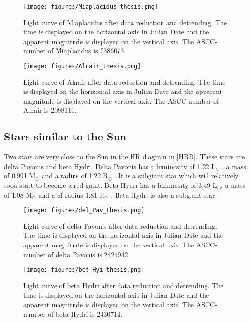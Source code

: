 \documentclass[onecolumn]{aa} %
\begin{document}
\begin{enumerate}
\begin{figure}
    \centering
    \texttt{[image: figures/Miaplacidus\_thesis.png]}
    \caption{Light curve of Miaplacidus after data reduction and detrending. The time is displayed on the horizontal axis in Julian Date and the apparent magnitude is displayed on the vertical axis. The ASCC-number of Miaplacidus is 2386073.}
    \label{Miaplacidus}
\end{figure}

\begin{figure}
    \centering
    \texttt{[image: figures/Alnair\_thesis.png]}
    \caption{Light curve of Alnair after data reduction and detrending. The time is displayed on the horizontal axis in Julian Date and the apparent magnitude is displayed on the vertical axis. The ASCC-number of Alnair is 2098110.}
    \label{Alnair}
\end{figure}
\end{enumerate}

\subsection{Stars similar to the Sun} 
Two stars are very close to the Sun in the HR diagram in \ref{HRD}. These stars are delta Pavonis and beta Hydri. Delta Pavonis has a luminosity of 1.22 L$_\odot$ \citep{Bruntt_2010}, a mass of 0.991 M$_\odot$ and a radius of 1.22 R$_\odot$ \citep{2008yCat..21680297T}. It is a subgiant star which will relatively soon start to become a red giant. Beta Hydri has a luminosity of 3.49 L$_\odot$, a mass of 1.08 M$_\odot$ and a of radius 1.81 R$_\odot$ \citep{Brand_o_2011}. Beta Hydri is also a subgiant star. 

\begin{figure}
    \centering
    \texttt{[image: figures/del\_Pav\_thesis.png]}
    \caption{Light curve of delta Pavonis after data reduction and detrending. The time is displayed on the horizontal axis in Julian Date and the apparent magnitude is displayed on the vertical axis. The ASCC-number of delta Pavonis is 2424942.}
    \label{del_Pav}
\end{figure}

\begin{figure}
    \centering
    \texttt{[image: figures/bet\_Hyi\_thesis.png]}
    \caption{Light curve of beta Hydri after data reduction and detrending. The time is displayed on the horizontal axis in Julian Date and the apparent magnitude is displayed on the vertical axis. The ASCC-number of beta Hydri is 2430714.}
    \label{bet_Hyi}
  \end{figure}
\end{document}

